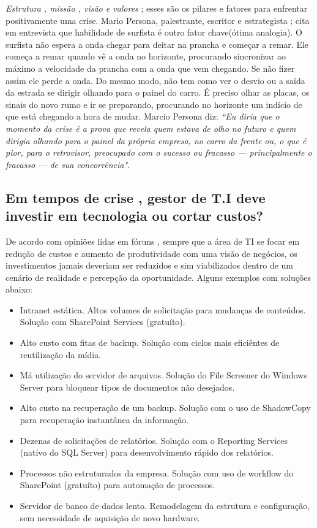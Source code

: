 \documentclass[11pt]{article}
\begin{document}
\textit{Estrutura , missão , visão e valores} ; esses são os pilares e fatores para enfrentar positivamente uma crise. Mario Persona, palestrante, escritor e estrategista ; cita em entrevista que habilidade de surfista é outro fator chave(ótima analogia). O surfista não espera a onda chegar para deitar na prancha e começar a remar. Ele começa a remar quando vê a onda no horizonte, procurando sincronizar ao máximo a velocidade da prancha com a onda que vem chegando. Se não fizer assim ele perde a onda. Do mesmo modo, não tem como ver o desvio ou a saída da estrada se dirigir olhando para o painel do carro. É preciso olhar as placas, os sinais do novo rumo e ir se preparando, procurando no horizonte um indício de que está chegando a hora de mudar. Marcio Persona diz: \textit{“Eu diria que o momento da crise é a prova que revela quem estava de olho no futuro e quem dirigia olhando para o painel da própria empresa, no carro da frente ou, o que é pior, para o retrovisor, preocupado com o sucesso ou fracasso — principalmente o fracasso — de sua concorrência"}.	

\subsection{Em tempos de crise , gestor de T.I deve investir em tecnologia ou cortar custos?}

De acordo com opiniões lidas em fóruns , sempre que a área de TI se focar em redução de custos e aumento de produtividade com uma visão de negócios, os investimentos jamais deveriam ser reduzidos e sim viabilizados dentro de um cenário de realidade e percepção da oportunidade. 
Alguns exemplos com soluções abaixo:

\begin{itemize}
	\item Intranet estática. Altos volumes de solicitação para mudanças de conteúdos. Solução com SharePoint Services (gratuíto).
	\item Alto custo com fitas de backup. Solução com ciclos mais eficiêntes de reutilização da mídia.
	\item Má utilização do servidor de arquivos. Solução do File Screener do Windows Server para bloquear tipos de documentos não desejados.
	\item Alto custo na recuperação de um backup. Solução com o uso de ShadowCopy para recuperação instantânea da informação.
	\item Dezenas de solicitações de relatórios. Solução com o Reporting Services (nativo do SQL Server) para desenvolvimento rápido dos relatórios.
	\item Processos não estruturados da empresa. Solução com uso de workflow do SharePoint (gratuíto) para automação de processos.
	\item Servidor de banco de dados lento. Remodelagem da estrutura e configuração, sem necessidade de aquisição de novo hardware.
\end{itemize}
\end{document}
